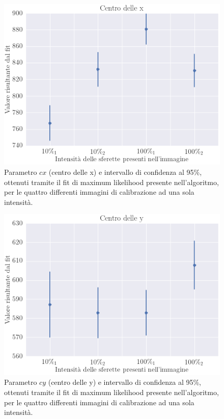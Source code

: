 \begin{figure}
 \centering
 \includegraphics[scale=.50]{img/CAP4cx.png}
 \caption{\small{Parametro $cx$ (centro delle x) e intervallo di confidenza al 95\%, ottenuti tramite il fit di maximum likelihood presente nell'algoritmo, per le quattro differenti immagini di calibrazione ad una sola intensità.}}
 \label{fig:cx}
\end{figure}

\begin{figure}
 \centering
 \includegraphics[scale=.50]{img/CAP4cy.png}
 \caption{\small{Parametro $cy$ (centro delle y) e intervallo di confidenza al 95\%, ottenuti tramite il fit di maximum likelihood presente nell'algoritmo, per le quattro differenti immagini di calibrazione ad una sola intensità.}}
 \label{fig:cy}
\end{figure}

